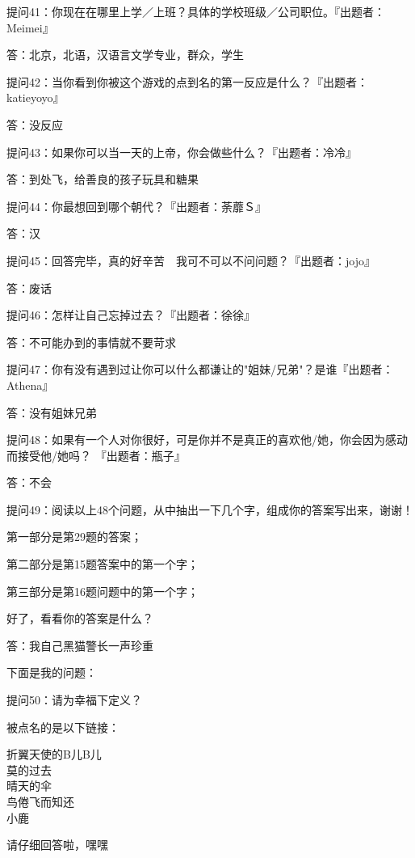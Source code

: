 \documentclass[12pt,a4paper]{article}
\def\blankrev{\vspace{1ex}}									%
\begin{document}
		\blankrev
		提问41：你现在在哪里上学／上班？具体的学校班级／公司职位。『出题者：Meimei』\par
		答：北京，北语，汉语言文学专业，群众，学生

		\blankrev
		提问42：当你看到你被这个游戏的点到名的第一反应是什么？『出题者：katieyoyo』\par
		答：没反应

		\blankrev
		提问43：如果你可以当一天的上帝，你会做些什么？『出题者：冷冷』\par
		答：到处飞，给善良的孩子玩具和糖果

		\blankrev
		提问44：你最想回到哪个朝代？『出题者：荼蘼Ｓ』\par
		答：汉

		\blankrev
		提问45：回答完毕，真的好辛苦　我可不可以不问问题？『出题者：jojo』\par
		答：废话

		\blankrev
		提问46：怎样让自己忘掉过去？『出题者：徐徐』\par
		答：不可能办到的事情就不要苛求

		\blankrev
		提问47：你有没有遇到过让你可以什么都谦让的"姐妹/兄弟"？是谁『出题者：Athena』\par
		答：没有姐妹兄弟

		\blankrev
		提问48：如果有一个人对你很好，可是你并不是真正的喜欢他/她，你会因为感动而接受他/她吗？
				『出题者：瓶子』\par
		答：不会

		提问49：阅读以上48个问题，从中抽出一下几个字，组成你的答案写出来，谢谢！\par
		第一部分是第29题的答案；\par
		第二部分是第15题答案中的第一个字；\par
		第三部分是第16题问题中的第一个字；\par
		好了，看看你的答案是什么？\par
		答：我自己黑猫警长一声珍重

		\blankrev \blankrev
		下面是我的问题：\par
		提问50：请为幸福下定义？

		\blankrev
		被点名的是以下链接：

		\indentenv{4\ccwd}{0\ccwd}{}
		折翼天使的B儿B儿 \\
		莫的过去 \\
		晴天的伞 \\
		鸟倦飞而知还 \\
		小鹿
		\endindentenv

		请仔细回答啦，嘿嘿
\end{document}
